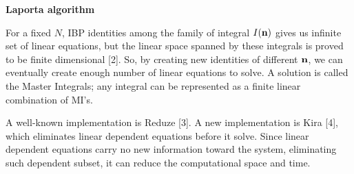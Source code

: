 \documentclass[10pt]{article}
\begin{document}
\textbf{Laporta algorithm}

For a fixed $N$, IBP identities among the family of integral $I(\bold{n})$ gives us infinite set of linear equations, but the linear space spanned by these integrals is proved to be finite dimensional [2].
So, by creating new identities of different $\bold{n}$, we can eventually create enough number of linear equations to solve.
A solution is called the Master Integrals; any integral can be represented as a finite linear combination of MI's.

A well-known implementation is Reduze [3].
A new implementation is Kira [4], which eliminates linear dependent equations before it solve.
Since linear dependent equations carry no new information toward the system, eliminating such dependent subset, it can reduce the computational space and time.
\end{document}
